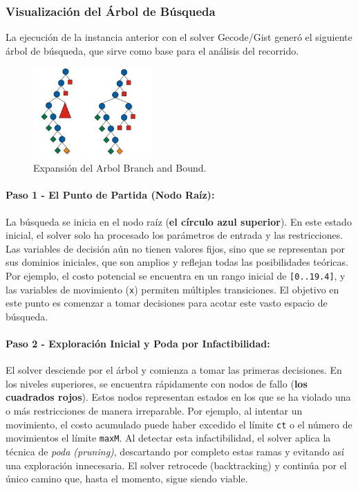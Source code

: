 \documentclass[11pt,letter]{article}
\begin{document}
\subsubsection*{Visualización del Árbol de Búsqueda}
La ejecución de la instancia anterior con el solver Gecode/Gist generó el siguiente árbol de búsqueda, que sirve como base para el análisis del recorrido.
\begin{figure}[H]
            \centering
            \includegraphics[width=0.4\textwidth]{resources/branchandbound.png}
            \caption{Expansión del Arbol Branch and Bound.}
        \end{figure}

\paragraph{Paso 1 - El Punto de Partida (Nodo Raíz):}
La búsqueda se inicia en el nodo raíz (\textbf{el círculo azul superior}). En este estado inicial, el solver solo ha procesado los parámetros de entrada y las restricciones. Las variables de decisión aún no tienen valores fijos, sino que se representan por sus dominios iniciales, que son amplios y reflejan todas las posibilidades teóricas. Por ejemplo, el costo potencial se encuentra en un rango inicial de \texttt{[0..19.4]}, y las variables de movimiento (\texttt{x}) permiten múltiples transiciones. El objetivo en este punto es comenzar a tomar decisiones para acotar este vasto espacio de búsqueda.

\paragraph{Paso 2 - Exploración Inicial y Poda por Infactibilidad:}
El solver desciende por el árbol y comienza a tomar las primeras decisiones. En los niveles superiores, se encuentra rápidamente con nodos de fallo (\textbf{los cuadrados rojos}). Estos nodos representan estados en los que se ha violado una o más restricciones de manera irreparable. Por ejemplo, al intentar un movimiento, el costo acumulado puede haber excedido el límite \texttt{ct} o el número de movimientos el límite \texttt{maxM}. Al detectar esta infactibilidad, el solver aplica la técnica de \textit{poda (pruning)}, descartando por completo estas ramas y evitando así una exploración innecesaria. El solver retrocede (backtracking) y continúa por el único camino que, hasta el momento, sigue siendo viable.
\end{document}
